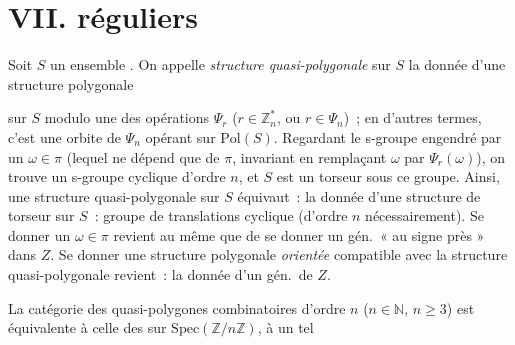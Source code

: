 \documentclass[11pt,a4paper]{article}
\begin{document}
\section{VII.   réguliers \struck{\ill{}} }


Soit $S$ un ensemble . On appelle \emph{structure quasi-polygonale} sur $S$ la donnée d'une structure polygonale

sur $S$ modulo une des opérations $\Psi_r$ ($r \in \mathbb{Z}_n^{*}$, ou $r \in \Psi_n$)~;  en d'autres termes, c'est une orbite \add{$\pi$} de $\Psi_n$ opérant sur $\mathrm{Pol}(S)$. Regardant le s-groupe  engendré par un $\omega \in \pi$ (lequel ne dépend que de $\pi$,  invariant en remplaçant $\omega$ par $\Psi_r(\omega)$), on trouve un s-groupe cyclique d'ordre $n$, et $S$ est un torseur sous ce groupe. Ainsi, une structure quasi-polygonale sur $S$ équivaut~: la donnée d'une structure de torseur sur $S$~: groupe   de translations cyclique (d'ordre $n$ nécessairement). Se donner un $\omega \in \pi$ revient au même que de se donner un gén.\ « au signe près » dans $Z$. Se donner une structure polygonale \emph{orientée} compatible avec la structure quasi-polygonale revient~: la donnée d'un gén.\ de $Z$.

La catégorie des  quasi-polygones combinatoires d'ordre $n$ ($n \in \mathbb{N}$, $n \geq 3$) est équivalente à celle des  \ill{}  sur $\mathrm{Spec}(\mathbb{Z}/n\mathbb{Z})$, à un tel
\end{document}
